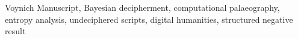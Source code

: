 Voynich Manuscript, Bayesian decipherment, computational palaeography, entropy analysis, undeciphered scripts, digital humanities, structured negative result
